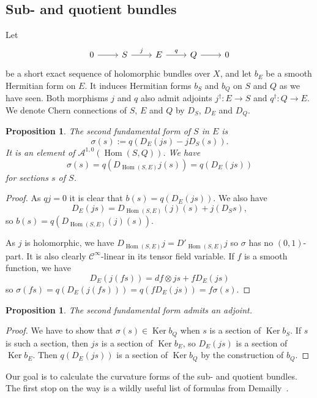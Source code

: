 \documentclass[10pt,a4paper]{amsart}
\newtheorem{prop}[theo]{Proposition}
\theoremstyle{definition}
\newcommand{\cc}[1]{\mathcal{#1}}
\DeclareMathOperator{\Ker}{Ker}
\DeclareMathOperator{\Hom}{Hom}
\def\snd{\sigma}
\begin{document}
\subsection*{Sub- and quotient bundles}

Let
\[
\begin{tikzcd}
0 \ar[r] &
S \ar[r,"j"] &
E \ar[r,"q"] &
Q \ar[r] &
0
\end{tikzcd}
\]
be a short exact sequence of holomorphic bundles over $X$, and let $b_E$ be a smooth Hermitian form on $E$. It induces Hermitian forms $b_S$ and $b_Q$ on $S$ and $Q$ as we have seen. Both morphisms $j$ and $q$ also admit adjoints $j^\dagger: E \to S$ and $q^\dagger : Q \to E$. We denote Chern connections of $S$, $E$ and $Q$ by $D_S$, $D_E$ and $D_Q$.




\begin{prop}
The \emph{second fundamental form} of $S$ in $E$ is
\[
\snd(s) := q(D_E(js) - jD_S(s)).
\]
It is an element of $\cc A^{1,0}(\Hom(S,Q))$.
We have
\[
\snd(s)
= q(D_{\Hom(S,E)}j(s))
= q(D_E(js))
\]
for sections $s$ of $S$.
\end{prop}

\begin{proof}
As $qj = 0$ it is clear that $b(s) = q(D_E(js))$. We also have
\[
D_E(js) = D_{\Hom(S,E)}(j)(s) + j(D_Ss),
\]
so $b(s) = q(D_{\Hom(S,E)}(j)(s))$.

As $j$ is holomorphic, we have $D_{\Hom(S,E)}j = D'_{\Hom(S,E)}j$ so $\snd$ has no $(0,1)$-part. It is also clearly $\cc C^\infty$-linear in its tensor field variable. If $f$ is a smooth function, we have
\[
D_E(j(fs))
= df \otimes js + f D_E(js)
\]
so $\snd(fs) = q(D_E(j(fs))) = q(f D_E(js)) = f\snd(s)$.
\end{proof}


\begin{prop}
The second fundamental form admits an adjoint.
\end{prop}

\begin{proof}
We have to show that $\snd(s) \in \Ker b_Q$ when $s$ is a section of $\Ker b_S$. If $s$ is such a section, then $js$ is a section of $\Ker b_E$, so $D_E(js)$ is a section of $\Ker b_E$. Then $q(D_E(js))$ is a section of $\Ker b_Q$ by the construction of $b_Q$.
\end{proof}



Our goal is to calculate the curvature forms of the sub- and quotient bundles. The first stop on the way is a wildly useful list of formulas from Demailly~{{\cite[Theorem~14.3]{demailly-complex}}}.
\end{document}

